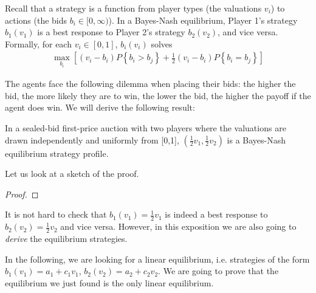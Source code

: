 Recall that a strategy is a function from player types (the valuations $v_i$) to actions (the bids $b_i \in [0, \infty)$). In a Bayes-Nash equilibrium, Player 1's strategy $b_1(v_1)$ is a best response to Player 2's strategy $b_2(v_2)$, and vice versa. Formally, for each $v_i \in [0,1]$, $b_i(v_i)$ solves
\begin{align}
 \max_{b_i} \left[ \left(v_i - b_i\right) P \left\{ b_i > b_j \right\} + \frac{1}{2} \left(v_i - b_i\right)P \left\{ b_i = b_j \right\} \right] \label{eq:auc:1}
\end{align}

The agents face the following dilemma when placing their bids: the higher the bid, the more likely they are to win, the lower the bid, the higher the payoff if the agent does win. We will derive the following result:
\begin{theorem}
In a sealed-bid first-price auction with two players where the valuations are drawn independently and uniformly from [0,1], $\left(\frac{1}{2}v_1,\frac{1}{2}v_2\right)$ is a Bayes-Nash equilibrium strategy profile.
\end{theorem}

Let us look at a sketch of the proof.
\begin{proof}
	
\end{proof}

It is not hard to check that $b_1(v_1)=\frac{1}{2}v_1$ is indeed a best response to $b_2(v_2)=\frac{1}{2}v_2$ and vice versa. However, in this exposition we are also going to \emph{derive} the equilibrium strategies.

In the following, we are looking for a linear equilibrium, i.e. strategies of the form $b_1(v_1) = a_1 + c_1 v_1$, $b_2(v_2) = a_2 + c_2 v_2$. We are going to prove that the equilibrium we just found is the only linear equilibrium.

